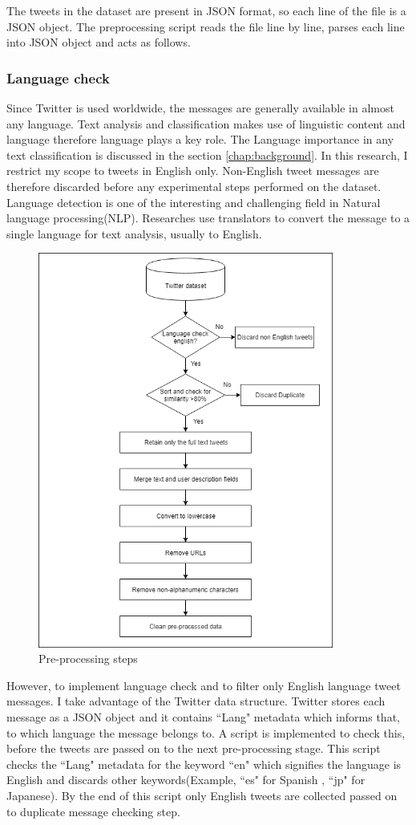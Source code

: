 The tweets in the dataset are present in JSON format, so each line of the file is a JSON object. The preprocessing script reads the file line by line, parses each line into JSON object and acts as follows.

\subsubsection{Language check}
Since Twitter is used worldwide, the messages are generally available in almost any language. Text analysis and classification makes use of linguistic content and language therefore language plays a key role. The Language importance in any text classification is discussed in the section \ref{chap:background}. In this research, I restrict my scope to tweets in English only. Non-English tweet messages are therefore discarded before any experimental steps performed on the dataset. 
Language detection is one of the interesting and challenging field in Natural language processing(NLP). Researches use translators to convert the message to a single language for text analysis, usually to English.
\begin{figure}
	\centering
	\includegraphics[width=10cm\linewidth,height=13cm]{thesis_template/images/preprocessing.png}
	\caption{Pre-processing steps}
	\label{fig:preprocessing}
\end{figure}
However, to implement language check and to filter only English language tweet messages. I take advantage of the Twitter data structure. Twitter stores each message as a JSON object and it contains ``Lang" metadata which  informs that, to which language the message belongs to. A script is implemented to check this, before the tweets are passed on to the next pre-processing stage. This script checks the ``Lang" metadata for the keyword ``en" which signifies the language is English and discards other keywords(Example, ``es" for Spanish , ``jp" for Japanese). By the end of this script only English tweets are collected passed on to duplicate message checking step.  

